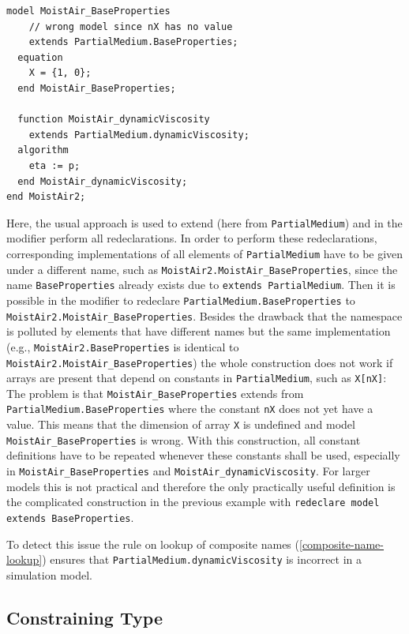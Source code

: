 \begin{example}
\begin{lstlisting}[language=modelica]
  model MoistAir_BaseProperties
    // wrong model since nX has no value
    extends PartialMedium.BaseProperties;
  equation
    X = {1, 0};
  end MoistAir_BaseProperties;

  function MoistAir_dynamicViscosity
    extends PartialMedium.dynamicViscosity;
  algorithm
    eta := p;
  end MoistAir_dynamicViscosity;
end MoistAir2;
\end{lstlisting}

Here, the usual approach is used to extend (here from \lstinline!PartialMedium!) and in the modifier perform all redeclarations.
In order to perform these redeclarations, corresponding implementations of all elements of \lstinline!PartialMedium! have to be given under a different name, such as \lstinline!MoistAir2.MoistAir_BaseProperties!, since the name \lstinline!BaseProperties! already exists due to \lstinline!extends PartialMedium!.
Then it is possible in the modifier to redeclare \lstinline!PartialMedium.BaseProperties! to \lstinline!MoistAir2.MoistAir_BaseProperties!.
Besides the drawback that the namespace is polluted by elements that have different names but the same implementation (e.g., \lstinline!MoistAir2.BaseProperties! is identical to \lstinline!MoistAir2.MoistAir_BaseProperties!) the whole construction does not work if arrays are present that depend on constants in \lstinline!PartialMedium!, such as \lstinline!X[nX]!:
The problem is that \lstinline!MoistAir_BaseProperties! extends from \lstinline!PartialMedium.BaseProperties! where the constant \lstinline!nX! does not yet have a value.
This means that the dimension of array \lstinline!X! is undefined and model \lstinline!MoistAir_BaseProperties! is wrong.
With this construction, all constant definitions have to be repeated whenever these constants shall be used, especially in \lstinline!MoistAir_BaseProperties! and \lstinline!MoistAir_dynamicViscosity!.
For larger models this is not practical and therefore the only practically useful definition is the complicated construction in the previous example with \lstinline!redeclare model extends BaseProperties!.

To detect this issue the rule on lookup of composite names (\cref{composite-name-lookup}) ensures that \lstinline!PartialMedium.dynamicViscosity! is incorrect in a simulation model.
\end{example}


\subsection{Constraining Type}\label{constraining-type}

